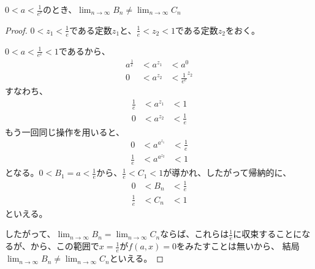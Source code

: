 	\begin{lemma}
		$0 < a < \frac{1}{e^e}$のとき、$\lim_{n \to \infty} B_n \neq \lim_{n \to \infty} C_n$
	\end{lemma}
	\begin{proof}
	
		$0 < z_1 < \frac{1}{e}$である定数$z_1$と、$\frac{1}{e} < z_2 < 1$である定数$z_2$をおく。
		
		$0 < a < \frac{1}{e^e} < 1$であるから、
		\begin{align*}
			a^\frac{1}{e} &< a^{z_1} &< a^0 \\
						0 &< a^{z_2} &< \frac{1}{e^e}^{z_2}
		\end{align*}
		すなわち、
		\begin{align*}
			\frac{1}{e} &< a^{z_1} &< 1 \\
					  0 &< a^{z_2} &< \frac{1}{e}
		\end{align*}
		もう一回同じ操作を用いると、
		\begin{align*}
					  0 &< a^{a^{z_1}} &< \frac{1}{e} \\
			\frac{1}{e} &< a^{a^{z_2}} &< 1
		\end{align*}
		となる。$0 < B_1 = a < \frac{1}{e}$から、$\frac{1}{e} < C_1 < 1$が導かれ、したがって帰納的に、
		\begin{align*}
					  0 &< B_n &< \frac{1}{e} \\
			\frac{1}{e} &< C_n &< 1
		\end{align*}
		といえる。
		
		したがって、$\lim_{n \to \infty} B_n = \lim_{n \to \infty} C_n$ならば、これらは$\frac{1}{e}$に収束することになるが、から、この範囲で$x = \frac{1}{e}$が$f(a,x) = 0$をみたすことは無いから、
		結局$\lim_{n \to \infty} B_n \neq \lim_{n \to \infty} C_n$といえる。
	\end{proof}
	
	